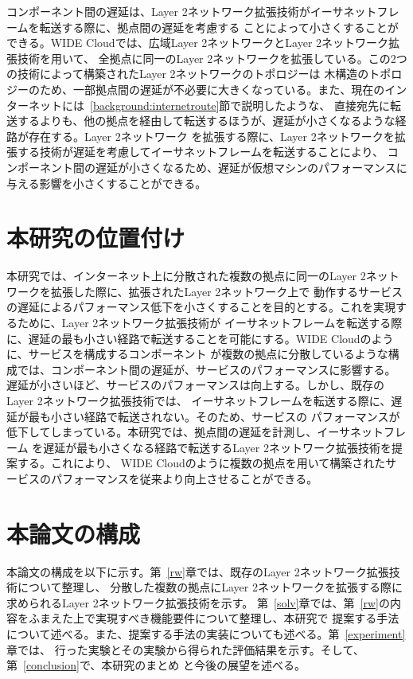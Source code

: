 コンポーネント間の遅延は、Layer 2ネットワーク拡張技術がイーサネットフレームを転送する際に、拠点間の遅延を考慮する
ことによって小さくすることができる。WIDE Cloudでは、広域Layer 2ネットワークとLayer 2ネットワーク拡張技術を用いて、
全拠点に同一のLayer 2ネットワークを拡張している。この2つの技術によって構築されたLayer 2ネットワークのトポロジーは
木構造のトポロジーのため、一部拠点間の遅延が不必要に大きくなっている。また、現在のインターネットには~\ref{background:internetroute}節で説明したような、
直接宛先に転送するよりも、他の拠点を経由して転送するほうが、遅延が小さくなるような経路が存在する。Layer 2ネットワーク
を拡張する際に、Layer 2ネットワークを拡張する技術が遅延を考慮してイーサネットフレームを転送することにより、
コンポーネント間の遅延が小さくなるため、遅延が仮想マシンのパフォーマンスに与える影響を小さくすることができる。

\section{本研究の位置付け}
\label{background:thisresearch}


本研究では、インターネット上に分散された複数の拠点に同一のLayer 2ネットワークを拡張した際に、拡張されたLayer 2ネットワーク上で
動作するサービスの遅延によるパフォーマンス低下を小さくすることを目的とする。これを実現するために、Layer 2ネットワーク拡張技術が
イーサネットフレームを転送する際に、遅延の最も小さい経路で転送することを可能にする。WIDE Cloudのように、サービスを構成するコンポーネント
が複数の拠点に分散しているような構成では、コンポーネント間の遅延が、サービスのパフォーマンスに影響する。
遅延が小さいほど、サービスのパフォーマンスは向上する。しかし、既存のLayer 2ネットワーク拡張技術では、
イーサネットフレームを転送する際に、遅延が最も小さい経路で転送されない。そのため、サービスの
パフォーマンスが低下してしまっている。本研究では、拠点間の遅延を計測し、イーサネットフレーム
を遅延が最も小さくなる経路で転送するLayer 2ネットワーク拡張技術を提案する。これにより、
WIDE Cloudのように複数の拠点を用いて構築されたサービスのパフォーマンスを従来より向上させることができる。


\section{本論文の構成}

本論文の構成を以下に示す。第~\ref{rw}章では、既存のLayer 2ネットワーク拡張技術について整理し、
分散した複数の拠点にLayer 2ネットワークを拡張する際に求められるLayer 2ネットワーク拡張技術を示す。
第~\ref{solv}章では、第~\ref{rw}の内容をふまえた上で実現すべき機能要件について整理し、本研究で
提案する手法について述べる。また、提案する手法の実装についても述べる。第~\ref{experiment}章では、
行った実験とその実験から得られた評価結果を示す。そして、第~\ref{conclusion}で、本研究のまとめ
と今後の展望を述べる。

